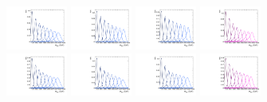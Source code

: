 \begin{figure}[htbp]
  \centering
  \includegraphics[width=0.18\textwidth]{fig/2Dfit/templateSignalVsMX_fromDC_VBFGbuToWW_MVV_mu_HP_bb_HDy.pdf}
  \includegraphics[width=0.18\textwidth]{fig/2Dfit/templateSignalVsMX_fromDC_VBFRadToWW_MVV_mu_HP_bb_HDy.pdf}
  \includegraphics[width=0.18\textwidth]{fig/2Dfit/templateSignalVsMX_fromDC_VBFZprToWW_MVV_mu_HP_bb_HDy.pdf}
  \includegraphics[width=0.18\textwidth]{fig/2Dfit/templateSignalVsMX_fromDC_VBFWprToWZ_MVV_mu_HP_bb_HDy.pdf}\\
  \includegraphics[width=0.18\textwidth]{fig/2Dfit/templateSignalVsMX_fromDC_VBFGbuToWW_MVV_mu_LP_bb_HDy.pdf}
  \includegraphics[width=0.18\textwidth]{fig/2Dfit/templateSignalVsMX_fromDC_VBFRadToWW_MVV_mu_LP_bb_HDy.pdf}
  \includegraphics[width=0.18\textwidth]{fig/2Dfit/templateSignalVsMX_fromDC_VBFZprToWW_MVV_mu_LP_bb_HDy.pdf}
  \includegraphics[width=0.18\textwidth]{fig/2Dfit/templateSignalVsMX_fromDC_VBFWprToWZ_MVV_mu_LP_bb_HDy.pdf}\\

\end{figure}
